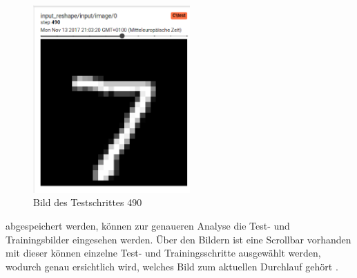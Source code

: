 \vspace{1.4cm}
\begin{figure}
	\vspace{-45pt}
	\includegraphics[width=6cm]{images/Kapitel_3/images.png}
	\caption{Bild des Testschrittes 490}
\end{figure}

abgespeichert werden, können zur genaueren Analyse die Test- und Trainingsbilder eingesehen werden. 
Über den Bildern ist eine Scrollbar vorhanden mit dieser können einzelne Test- und Trainingsschritte ausgewählt werden, wodurch genau ersichtlich wird, welches Bild zum aktuellen Durchlauf gehört \cite{tensorboard.2017}.
\vspace{50pt}
\newpage


